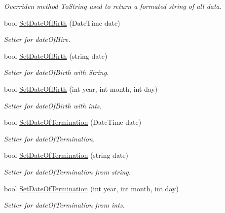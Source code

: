 \begin{DoxyCompactItemize}
\begin{DoxyCompactList}\small\item\em Overriden method To\+String used to return a formated string of all data. \end{DoxyCompactList}\item 
bool \hyperlink{class_all_employees_1_1_parttime_employee_af7fd1fa3826eba7a64c896e41858a993}{Set\+Date\+Of\+Birth} (Date\+Time date)
\begin{DoxyCompactList}\small\item\em Setter for date\+Of\+Hire. \end{DoxyCompactList}\item 
bool \hyperlink{class_all_employees_1_1_parttime_employee_aa8d8ac3cf83bc2cecfcf76bfdd1c3341}{Set\+Date\+Of\+Birth} (string date)
\begin{DoxyCompactList}\small\item\em Setter for date\+Of\+Birth with String. \end{DoxyCompactList}\item 
bool \hyperlink{class_all_employees_1_1_parttime_employee_a053ae556cf24daa7f7c625f4eecc5414}{Set\+Date\+Of\+Birth} (int year, int month, int day)
\begin{DoxyCompactList}\small\item\em Setter for date\+Of\+Birth with ints. \end{DoxyCompactList}\item 
bool \hyperlink{class_all_employees_1_1_parttime_employee_a13b87ed00ebf4f834d6c9ff5b3051ca0}{Set\+Date\+Of\+Termination} (Date\+Time date)
\begin{DoxyCompactList}\small\item\em Setter for date\+Of\+Termination. \end{DoxyCompactList}\item 
bool \hyperlink{class_all_employees_1_1_parttime_employee_a305894433e372ba1511999889eebd7f0}{Set\+Date\+Of\+Termination} (string date)
\begin{DoxyCompactList}\small\item\em Setter for date\+Of\+Termination from string. \end{DoxyCompactList}\item 
bool \hyperlink{class_all_employees_1_1_parttime_employee_ad1738c15831d445694a56cf31eaf1e65}{Set\+Date\+Of\+Termination} (int year, int month, int day)
\begin{DoxyCompactList}\small\item\em Setter for date\+Of\+Termination from ints. \end{DoxyCompactList}\item 

\end{DoxyCompactItemize}
